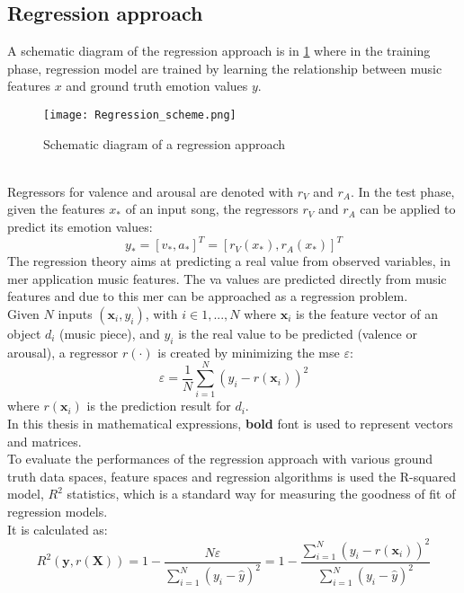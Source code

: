 \subsection{Regression approach}
A schematic diagram of the regression approach is in \ref{fig:Regression_scheme} where in the training phase, regression model are trained by learning the relationship between music features $x$ and ground truth emotion values $y$.
\\
\begin{figure}[h]
    \centering
    \texttt{[image: Regression\_scheme.png]} 
	\caption{Schematic diagram of a regression approach}
    \label{fig:Regression_scheme}
\end{figure}
\\
Regressors for valence and arousal are denoted with $r_V$ and $r_A$. In the test phase, given the features $x_*$ of an input song, the regressors $r_V$ and $r_A$ can be applied to predict its emotion values:
\begin{equation}
	y_*=[v_*,a_*]^T = [r_V(x_*), r_A(x_*)]^T
\end{equation}
The regression theory aims at predicting a real value from observed variables, in \gls{mer} application music features.  The \gls{va} values are predicted directly from music features and due to this \gls{mer} can be approached as a regression problem.
\\ \indent
Given $N$ inputs $(\textbf{x}_i,y_i)$, with $i \in {1, ..., N}$ where $\textbf{x}_i$ is the feature vector of an object $d_i$ (music piece), and $y_i$ is the real value to be predicted (valence or arousal), a regressor $r(\cdot)$ is created by minimizing the \gls{mse} $\varepsilon$:
\begin{equation}
	\varepsilon = \dfrac{1}{N} \sum_{i=1}^{N} (y_i-r(\textbf{x}_i))^2
\end{equation}
where $r(\textbf{x}_i)$ is the prediction result for $d_i$.
\\
In this thesis in mathematical expressions, \textbf{bold} font is used to represent vectors and matrices.
\\ \indent
To evaluate the performances of the regression approach with various ground truth data spaces, feature spaces and regression algorithms is used the R-squared model, $R^2$ statistics, which is a standard way for measuring the goodness of fit of regression models.
\\
It is calculated as:
\begin{equation}
	R^2(\textbf{y},r(\textbf{X}))=1-\dfrac{N\varepsilon}{\sum_{i=1}^{N} (y_i-\widehat{y})^2}=1-\dfrac{\sum_{i=1}^{N} (y_i-r(\textbf{x}_i))^2}{\sum_{i=1}^{N} (y_i-\widehat{y})^2}
\end{equation}
